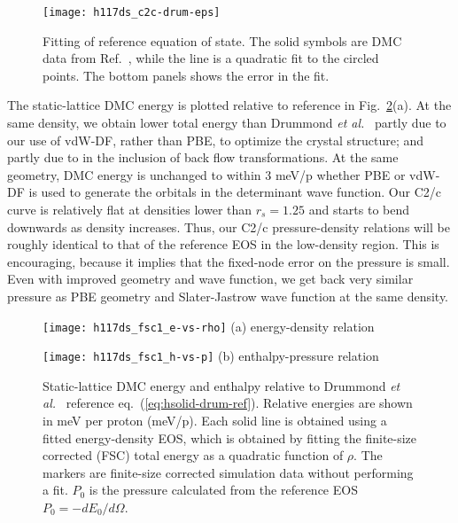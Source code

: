 \begin{figure}[h]
\centering
\texttt{[image: h117ds\_c2c-drum-eps]}
\caption{Fitting of reference equation of state. The solid symbols are DMC data from Ref.~\cite{Drummond2015}, while the line is a quadratic fit to the circled points. The bottom panels shows the error in the fit.}
\label{fig:hsolid-drum-eos}
\end{figure}

The static-lattice DMC energy is plotted relative to reference in Fig.~\ref{fig:static-qmc-vs-drummond}(a). At the same density, we obtain lower total energy than Drummond \textit{et al.}~\cite{Drummond2015} partly due to our use of vdW-DF, rather than  PBE, to optimize the crystal structure; and partly due to in the inclusion of back flow transformations. At the same geometry, DMC energy is unchanged to within 3 meV/p whether PBE or vdW-DF is used to generate the orbitals in the determinant wave function.
Our C2/c curve is relatively flat at densities lower than $r_s=1.25$ and starts to bend downwards as density increases.
Thus, our C2/c pressure-density relations will be roughly identical to that of the reference EOS in the low-density region.
This is encouraging, because it implies that the fixed-node error on the pressure is small.
Even with improved geometry and wave function, we get back very similar pressure as PBE geometry and Slater-Jastrow wave function at the same density.

\begin{figure}[h]
\begin{minipage}{0.49\textwidth}
\centering
\texttt{[image: h117ds\_fsc1\_e-vs-rho]}
(a) energy-density relation
\end{minipage}
\begin{minipage}{0.49\textwidth}
\centering
\texttt{[image: h117ds\_fsc1\_h-vs-p]}
(b) enthalpy-pressure relation
\end{minipage}
\caption{Static-lattice DMC energy and enthalpy relative to Drummond \textit{et al.}~\cite{Drummond2015} reference eq.~(\ref{eq:hsolid-drum-ref}). Relative energies are shown in meV per proton (meV/p). Each solid line is obtained using a fitted energy-density EOS, which is obtained by fitting the finite-size corrected (FSC) total energy as a quadratic function of $\rho$. The markers are finite-size corrected simulation data without performing a fit. $P_0$ is the pressure calculated from the reference EOS $P_0=-dE_0/d\Omega$. \label{fig:static-qmc-vs-drummond}}
\end{figure}

